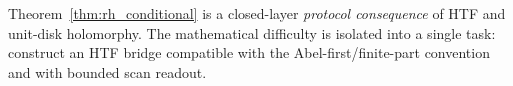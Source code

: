 \begin{remark}
Theorem~\ref{thm:rh_conditional} is a closed-layer \emph{protocol consequence} of HTF and unit-disk holomorphy.
The mathematical difficulty is isolated into a single task: construct an HTF bridge compatible with the Abel-first/finite-part convention and with bounded scan readout.
\end{remark}


